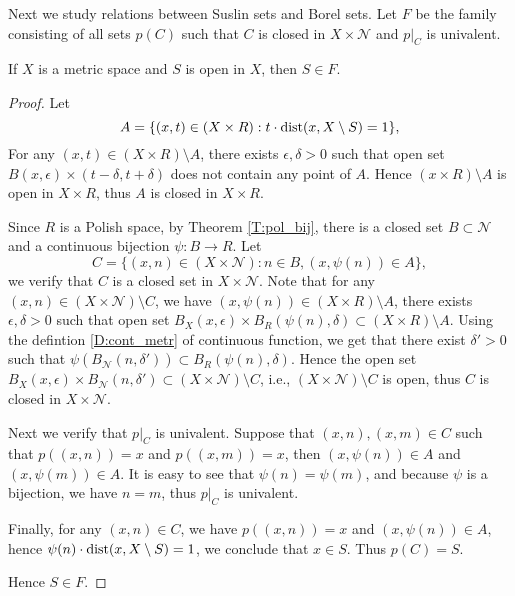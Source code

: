 Next we study relations between Suslin sets and Borel sets. Let $F$ be the
family consisting of all sets $p(C)$ such that $C$ is closed in 
$X\times \mathcal{N}$ and $p|_C$ is univalent.

\begin{lemma}
If $X$ is a metric space and $S$ is open in $X$, then $S\in F$.
\end{lemma}
\begin{proof}
Let 
\[
  A = \{ (x,t)\in (X\times R): t \cdot \operatorname*{dist}(x,X\setminus S) = 1 \},
\]
For any $(x,t)\in (X\times R)\setminus A$, there exists $\epsilon,\delta>0$ such
that open set $B(x,\epsilon)\times (t-\delta,t+\delta)$
does not contain any point of $A$.
Hence $(x\times R)\setminus A$ is open in $X\times R$, thus $A$ is closed 
in $X\times R$.

Since $R$ is a Polish space, by Theorem \ref{T:pol_bij}, there is a closed set
$B\subset\mathcal{N}$ and a continuous bijection $\psi:B\to R$. Let
\[
  C = \{ (x,n)\in (X\times\mathcal{N}) : n\in B, (x,\psi(n))\in A \},
\]
we verify that $C$ is a closed set in $X\times\mathcal{N}$.
Note that for any $(x,n)\in (X\times\mathcal{N})\setminus C$, we have
$(x,\psi(n))\in (X\times R)\setminus A$, 
there exists $\epsilon,\delta>0$ such that open set 
$B_X(x,\epsilon)\times B_R(\psi(n),\delta)\subset (X\times R)\setminus A$.
Using the defintion \ref{D:cont_metr} of continuous function, we get that there
exist $\delta'>0$ such that 
$\psi(B_{\mathcal{N}}(n,\delta'))\subset B_R(\psi(n),\delta)$. Hence the open
set
$B_X(x,\epsilon)\times B_{\mathcal{N}}(n,\delta')\subset
(X\times\mathcal{N})\setminus C$,
i.e., $(X\times\mathcal{N})\setminus C$ is open, thus $C$ is closed
in $X\times\mathcal{N}$.

Next we verify that $p|_C$ is univalent. Suppose that $(x,n),(x,m)\in C$ such
that $p((x,n))=x$ and $p((x,m))=x$, then $(x,\psi(n))\in A$ and 
$(x,\psi(m))\in A$. It is easy to see that $\psi(n)=\psi(m)$, and because $\psi$
is a bijection, we have $n=m$, thus $p|_C$ is univalent.

Finally, for any $(x,n)\in C$, we have $p((x,n))=x$ and $(x,\psi(n))\in A$, 
hence $\psi(n) \cdot \operatorname*{dist}(x,X\setminus S)=1$, we conclude that $x\in S$. Thus 
$p(C)=S$.

Hence $S\in F$.
\end{proof}













